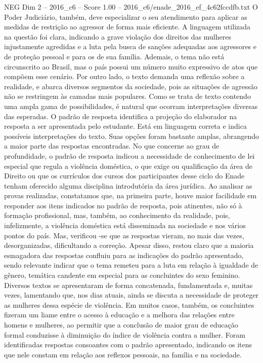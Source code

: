 \begin{textsample}{NEG Dim 2 – 2016\_c6 – Score 1.00 – 2016\_c6/enade\_2016\_ef\_4c62fccdfb.txt}
O Poder Judiciário, também, deve especializar o seu atendimento para aplicar as medidas de restrição ao agressor de forma mais eficiente.
A linguagem utilizada na questão foi clara, indicando a grave violação dos direitos das mulheres injustamente agredidas e a luta pela busca de sanções adequadas aos agressores e de proteção pessoal e para os de sua família.
Ademais, o tema não está circunscrito ao Brasil, mas o país possui um número muito expressivo de atos que compõem esse cenário.
Por outro lado, o texto demanda uma reflexão sobre a realidade, e abarca diversos segmentos da sociedade, pois as situações de agressão não se restringem às camadas mais populares.
Como se trata de texto contendo uma ampla gama de possibilidades, é natural que ocorram interpretações diversas das esperadas.
O padrão de resposta identifica a projeção do elaborador na resposta a ser apresentada pelo estudante.
Está em linguagem correta e indica possíveis interpretações do texto.
Suas opções foram bastante amplas, abrangendo a maior parte das respostas encontradas.
No que concerne ao grau de profundidade, o padrão de resposta indicou a necessidade de conhecimento de lei especial que regula a violência doméstica, o que exige ou qualificação da área de Direito ou que os currículos dos cursos dos participantes desse ciclo do Enade tenham oferecido alguma disciplina introdutória da área jurídica.
Ao analisar as provas realizadas, constatamos que, na primeira parte, houve maior facilidade em responder aos itens indicados no padrão de resposta, pois atinentes, não só à formação profissional, mas, também, ao conhecimento da realidade, pois, infelizmente, a violência doméstica está disseminada na sociedade e nos vários pontos do país.
Mas, verificou -se que as respostas vieram, no mais das vezes, desorganizadas, dificultando a correção.
Apesar disso, restou claro que a maioria esmagadora das respostas confluiu para as indicações do padrão apresentado, sendo relevante indicar que o tema remeteu para a luta em relação à igualdade de gênero, temática candente em especial para as concluintes do sexo feminino.
Diversos textos se apresentaram de forma concatenada, fundamentada e, muitas vezes, lamentando que, nos dias atuais, ainda se discuta a necessidade de proteger as mulheres dessa espécie de violência.
Em muitos casos, também, os concluintes fizeram um liame entre o acesso à educação e a melhora das relações entre homens e mulheres, ao permitir que a conclusão de maior grau de educação formal conduzisse à diminuição do índice de violência contra a mulher.
Foram identificadas respostas consoantes com o padrão apresentado, indicando os itens que nele constam em relação aos reflexos pessoais, na família e na sociedade.

\end{textsample}
